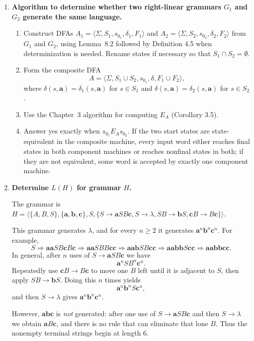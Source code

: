 \begin{enumerate}[{8.}1. ]
\item \textbf{Algorithm to determine whether two right-linear grammars $G_1$ and $G_2$ generate the same language.}

\begin{enumerate}
\item Construct DFAs
$A_1=\langle\Sigma,S_1,s_{0_1},\delta_1,F_1\rangle$ and
$A_2=\langle\Sigma,S_2,s_{0_2},\delta_2,F_2\rangle$ from $G_1$ and $G_2$,
using Lemma~8.2 followed by Definition 4.5 when determinization is
needed.  Rename states if necessary so that $S_1\cap S_2=\emptyset$.
\item Form the composite DFA
\[
A=\langle\Sigma,S_1\cup S_2,s_{0_1},\delta,F_1\cup F_2\rangle,
\]
where $\delta(s,\pmb{a})=\delta_1(s,\pmb{a})$ for $s\in S_1$ and
$\delta(s,\pmb{a})=\delta_2(s,\pmb{a})$ for $s\in S_2$.
\item Use the Chapter~3 algorithm for computing $E_A$ (Corollary 3.5).
\item Answer yes exactly when $s_{0_1}E_As_{0_2}$.  If the two start states are
state-equivalent in the composite machine, every input word either reaches final
states in both component machines or reaches nonfinal states in both; if they
are not equivalent, some word is accepted by exactly one component machine.
\end{enumerate}

\item \textbf{Determine $L(H)$ for grammar $H$.}

The grammar is $H = \langle\{A,B,S\},\{\pmb{a},\pmb{b},\pmb{c}\},S,\{S\to\pmb{a}SB\pmb{c},S\to\lambda,SB\to\pmb{b}S,\pmb{c}B\to B\pmb{c}\}\rangle$.

This grammar generates $\lambda$, and for every $n\ge 2$ it generates
$\pmb{a}^n\pmb{b}^n\pmb{c}^n$.  For example,
\[
S\Rightarrow \pmb{aa}SB\pmb{c}B\pmb{c}
\Rightarrow \pmb{aa}SBB\pmb{cc}
\Rightarrow \pmb{aab}SB\pmb{cc}
\Rightarrow \pmb{aabb}S\pmb{cc}
\Rightarrow \pmb{aabbcc}.
\]
In general, after $n$ uses of $S\to\pmb{a}SB\pmb{c}$ we have
\[
\pmb{a}^nSB^n\pmb{c}^n.
\]
Repeatedly use $\pmb{c}B\to B\pmb{c}$ to move one $B$ left until it is adjacent
to $S$, then apply $SB\to\pmb{b}S$.  Doing this $n$ times yields
\[
\pmb{a}^n\pmb{b}^nS\pmb{c}^n,
\]
and then $S\to\lambda$ gives $\pmb{a}^n\pmb{b}^n\pmb{c}^n$.

However, $\pmb{abc}$ is \emph{not} generated: after one use of
$S\to\pmb{a}SB\pmb{c}$ and then $S\to\lambda$ we obtain $\pmb{a}B\pmb{c}$, and
there is no rule that can eliminate that lone $B$.  Thus the nonempty terminal
strings begin at length $6$.


\end{enumerate}
